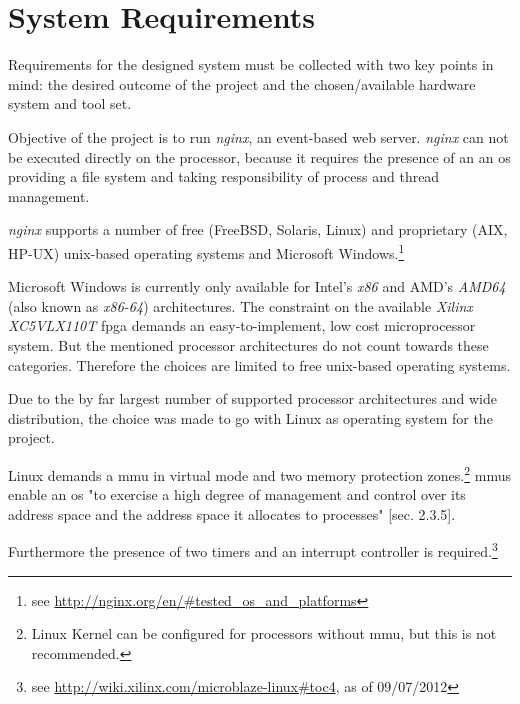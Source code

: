 \chapter{System Requirements}

Requirements for the designed system must be collected with two key points in mind: the desired outcome of the project and the chosen/available hardware system and tool set.

Objective of the project is to run \textit{nginx}, an event-based web server. \textit{nginx} can not be executed directly on the processor, because it requires the presence of an an \gls{os} providing a file system and taking responsibility of process and thread management. 

\textit{nginx} supports a number of free (FreeBSD, Solaris, Linux) and proprietary (AIX, HP-UX) unix-based operating systems and Microsoft Windows.\footnote{see \url{http://nginx.org/en/\#tested_os_and_platforms}}

Microsoft Windows is currently only available for Intel's \textit{x86} and AMD's \textit{AMD64} (also known as \textit{x86-64}) architectures. The constraint on the available \textit{Xilinx XC5VLX110T} \gls{fpga} demands an easy-to-implement, low cost microprocessor system. But the mentioned processor architectures do not count towards these categories. Therefore the choices are limited to free unix-based operating systems.

Due to the by far largest number of supported processor architectures and wide distribution, the choice was made to go with Linux as operating system for the project.

Linux demands a \gls{mmu} in virtual mode and two memory protection zones.\footnote{Linux Kernel can be configured for processors without \gls{mmu}, but this is not recommended.} \gls{mmu}s enable an \gls{os} "to exercise a high degree of
management and control over its address space and the address space it allocates to processes" \cite{linuxPrimer}[sec. 2.3.5].

Furthermore the presence of two timers and an interrupt controller is required.\footnote{see \url{http://wiki.xilinx.com/microblaze-linux\#toc4}, as of 09/07/2012}